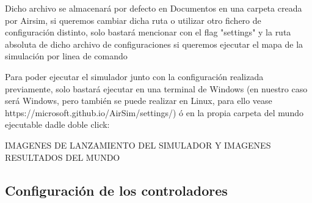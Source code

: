   Dicho archivo se almacenará por defecto en Documentos en una carpeta creada por Airsim, si queremos cambiar dicha ruta o utilizar otro fichero de configuración distinto, solo bastará
  mencionar con el flag "\-settings" y la ruta absoluta de dicho archivo de configuraciones si queremos ejecutar el mapa de la simulación por linea de comando \newline
  
  Para poder ejecutar el simulador junto con la configuración realizada previamente, solo bastará ejecutar en una terminal de Windows (en nuestro caso será Windows, pero también
  se puede realizar en Linux, para ello vease https://microsoft.github.io/AirSim/settings/) ó en la propia carpeta del mundo ejecutable dadle doble click:


  IMAGENES DE LANZAMIENTO DEL SIMULADOR Y IMAGENES RESULTADOS DEL MUNDO

  \subsection{Configuración de los controladores}
  \label{subsec:Configuración controladores}

